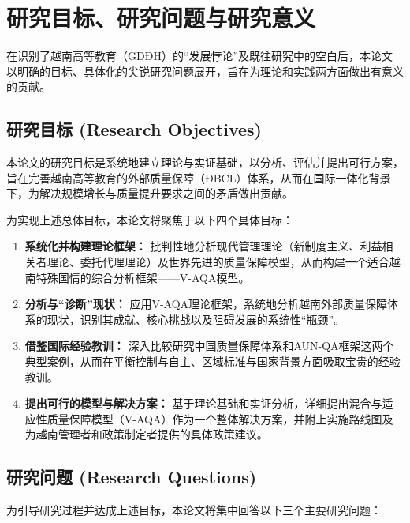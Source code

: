 
\section{研究目标、研究问题与研究意义}
\label{sec:muc_tieu_y_nghia}

在识别了越南高等教育（GDĐH）的“发展悖论”及既往研究中的空白后，本论文以明确的目标、具体化的尖锐研究问题展开，旨在为理论和实践两方面做出有意义的贡献。

\subsection{研究目标 (Research Objectives)}
\label{subsec:muc_tieu_nghien_cuu}

本论文的研究目标是系统地建立理论与实证基础，以分析、评估并提出可行方案，旨在完善越南高等教育的外部质量保障（ĐBCL）体系，从而在国际一体化背景下，为解决规模增长与质量提升要求之间的矛盾做出贡献。

为实现上述总体目标，本论文将聚焦于以下四个具体目标：
\begin{enumerate}
    \item \textbf{系统化并构建理论框架：} 批判性地分析现代管理理论（新制度主义、利益相关者理论、委托代理理论）及世界先进的质量保障模型，从而构建一个适合越南特殊国情的综合分析框架——V-AQA模型。
    
    \item \textbf{分析与“诊断”现状：} 应用V-AQA理论框架，系统地分析越南外部质量保障体系的现状，识别其成就、核心挑战以及阻碍发展的系统性“瓶颈”。
    
    \item \textbf{借鉴国际经验教训：} 深入比较研究中国质量保障体系和AUN-QA框架这两个典型案例，从而在平衡控制与自主、区域标准与国家背景方面吸取宝贵的经验教训。
    
    \item \textbf{提出可行的模型与解决方案：} 基于理论基础和实证分析，详细提出混合与适应性质量保障模型（V-AQA）作为一个整体解决方案，并附上实施路线图及为越南管理者和政策制定者提供的具体政策建议。
\end{enumerate}

\subsection{研究问题 (Research Questions)}
\label{subsec:cau_hoi_nghien_cuu}

为引导研究过程并达成上述目标，本论文将集中回答以下三个主要研究问题：

